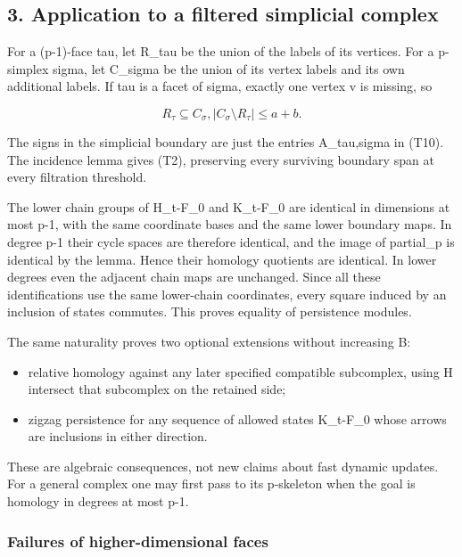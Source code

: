 \hypertarget{af-3f6acd6e5b-application-to-a-filtered-simplicial-complex}{%
\subsection{3. Application to a filtered simplicial complex}\label{af-3f6acd6e5b-application-to-a-filtered-simplicial-complex}}

For a (p-1)-face tau, let R\_tau be the union of the labels of its vertices. For a p-simplex sigma, let C\_sigma be the union of its vertex labels and its own additional labels. If tau is a facet of sigma, exactly one vertex v is missing, so

\[
R_\tau\subseteq C_\sigma,
                  |C_\sigma\setminus R_\tau|\le a+b.
 \tag{T13}
\]

The signs in the simplicial boundary are just the entries A\_tau,sigma in (T10). The incidence lemma gives (T2), preserving every surviving boundary span at every filtration threshold.

The lower chain groups of H\_t-F\_0 and K\_t-F\_0 are identical in dimensions at most p-1, with the same coordinate bases and the same lower boundary maps. In degree p-1 their cycle spaces are therefore identical, and the image of partial\_p is identical by the lemma. Hence their homology quotients are identical. In lower degrees even the adjacent chain maps are unchanged. Since all these identifications use the same lower-chain coordinates, every square induced by an inclusion of states commutes. This proves equality of persistence modules.

The same naturality proves two optional extensions without increasing B:

\begin{itemize}
\tightlist
\item
  relative homology against any later specified compatible subcomplex, using H intersect that subcomplex on the retained side;
\item
  zigzag persistence for any sequence of allowed states K\_t-F\_0 whose arrows are inclusions in either direction.
\end{itemize}

These are algebraic consequences, not new claims about fast dynamic updates. For a general complex one may first pass to its p-skeleton when the goal is homology in degrees at most p-1.

\hypertarget{af-3f6acd6e5b-failures-of-higher-dimensional-faces}{%
\subsubsection{Failures of higher-dimensional faces}\label{af-3f6acd6e5b-failures-of-higher-dimensional-faces}}

